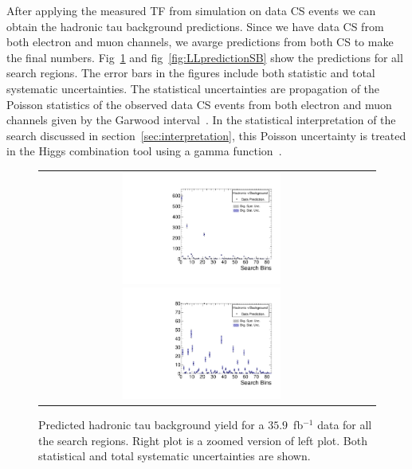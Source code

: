 After applying the measured TF from simulation on data CS events we can obtain the hadronic tau background predictions.
Since we have data CS from both electron and muon channels, we avarge predictions from both CS to make the final numbers.
Fig~\ref{fig:TAUpredictionSB} and fig~\ref{fig:LLpredictionSB} show the predictions for all search regions. The error bars in the figures
include both statistic and total systematic uncertainties. The statistical uncertainties are propagation of the Poisson statistics of the observed data CS events from both electron and                                                                             
muon channels given by the Garwood interval~\cite{GarwoodIntervalTwiki}.
In the statistical interpretation of the search discussed in section~\ref{sec:interpretation}, this Poisson uncertainty
is treated in the Higgs combination tool using a gamma function~\cite{HiggsCombine,cms-note-2011-005}.

\begin{figure}[htbp]
  \begin{center}
  \begin{tabular}{cc}
  \includegraphics[angle=0,width=0.5\textwidth]{sections/mc4/Backgrounds/TF/figures/pred_full_hadtau_comb.pdf}
  \includegraphics[angle=0,width=0.5\textwidth]{sections/mc4/Backgrounds/TF/figures/pred_zoomin_hadtau_comb.pdf}
  \end{tabular}
  \caption{Predicted hadronic tau background yield for a $35.9$~fb$^{-1}$ data for all the search regions. Right plot is a zoomed version of left plot.
Both statistical and total systematic uncertainties are shown. }
    \label{fig:TAUpredictionSB}
  \end{center}
\end{figure}

